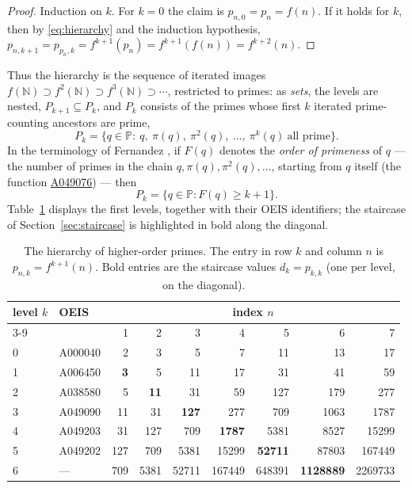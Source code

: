 \documentclass[11pt,a4paper]{article}
\theoremstyle{plain}
\theoremstyle{definition}
\newcommand{\N}{\mathbb{N}}
\newcommand{\Pset}{\mathbb{P}}
\begin{document}
\begin{proof}
Induction on $k$. For $k=0$ the claim is $p_{n,0}=p_n=f(n)$. If it holds for
$k$, then by \eqref{eq:hierarchy} and the induction hypothesis,
$p_{n,k+1}=p_{p_n,k}=f^{k+1}(p_n)=f^{k+1}(f(n))=f^{k+2}(n)$.
\end{proof}

Thus the hierarchy is the sequence of iterated images
$f(\N)\supset f^{2}(\N)\supset f^{3}(\N)\supset\cdots$, restricted to primes:
as \emph{sets}, the levels are nested, $P_{k+1}\subseteq P_k$, and $P_k$
consists of the primes whose first $k$ iterated prime-counting ancestors
are prime,
\[
  P_k=\{q\in\Pset:\ q,\ \pi(q),\ \pi^{2}(q),\ \ldots,\ \pi^{k}(q)
  \ \text{all prime}\}.
\]
In the terminology of Fernandez \cite{Fernandez}, if
$F(q)$ denotes the \emph{order of primeness} of $q$ --- the number of
primes in the chain $q,\pi(q),\pi^2(q),\ldots$, starting from $q$ itself
(the function \href{https://oeis.org/A049076}{A049076}) --- then
\begin{equation}\label{eq:orderset}
  P_k=\{q\in\Pset: F(q)\ge k+1\}.
\end{equation}
Table~\ref{tab:hierarchy} displays the first levels, together with their
OEIS identifiers; the staircase of Section~\ref{sec:staircase} is
highlighted in bold along the diagonal.

\begin{table}[htbp]
\centering
\small
\caption{The hierarchy of higher-order primes. The entry in row $k$ and
column $n$ is $p_{n,k}=f^{k+1}(n)$. Bold entries are the staircase values
$d_k=p_{k,k}$ (one per level, on the diagonal).}
\label{tab:hierarchy}
\begin{tabular}{@{}llrrrrrrr@{}}
\toprule
level $k$ & OEIS & \multicolumn{7}{c}{index $n$} \\
\cmidrule(l){3-9}
 & & 1 & 2 & 3 & 4 & 5 & 6 & 7 \\
\midrule
0 & A000040 & 2 & 3 & 5 & 7 & 11 & 13 & 17 \\
1 & A006450 & \textbf{3} & 5 & 11 & 17 & 31 & 41 & 59 \\
2 & A038580 & 5 & \textbf{11} & 31 & 59 & 127 & 179 & 277 \\
3 & A049090 & 11 & 31 & \textbf{127} & 277 & 709 & 1063 & 1787 \\
4 & A049203 & 31 & 127 & 709 & \textbf{1787} & 5381 & 8527 & 15299 \\
5 & A049202 & 127 & 709 & 5381 & 15299 & \textbf{52711} & 87803 & 167449 \\
6 & --- & 709 & 5381 & 52711 & 167449 & 648391 & \textbf{1128889} & 2269733 \\
\bottomrule
\end{tabular}
\end{table}
\end{document}
